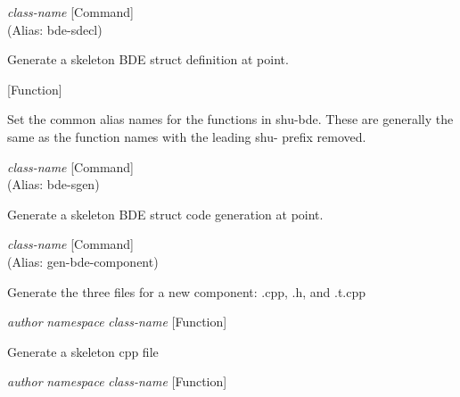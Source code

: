 \vspace{1em}
\noindent
{}
\usebox{\funcname}\emph{class-name}
 \hfill [Command]\\%
 (Alias: bde-sdecl)

\begin{doc-string}
Generate a skeleton BDE struct definition at point.
\end{doc-string}

\vspace{1em}
\noindent
{}
\usebox{\funcname}
 \hfill [Function]

\begin{doc-string}
Set the common alias names for the functions in shu-bde.
These are generally the same as the function names with the leading
shu- prefix removed.
\end{doc-string}

\vspace{1em}
\noindent
{}
\usebox{\funcname}\emph{class-name}
 \hfill [Command]\\%
 (Alias: bde-sgen)

\begin{doc-string}
Generate a skeleton BDE struct code generation at point.
\end{doc-string}

\vspace{1em}
\noindent
{}
\usebox{\funcname}\emph{class-name}
 \hfill [Command]\\%
 (Alias: gen-bde-component)

\begin{doc-string}
Generate the three files for a new component: .cpp, .h, and .t.cpp
\end{doc-string}

\vspace{1em}
\noindent
{}
\usebox{\funcname}\emph{author} \emph{namespace} \emph{class-name}
 \hfill [Function]

\begin{doc-string}
Generate a skeleton cpp file
\end{doc-string}

\vspace{1em}
\noindent
{}
\usebox{\funcname}\emph{author} \emph{namespace} \emph{class-name}
 \hfill [Function]


